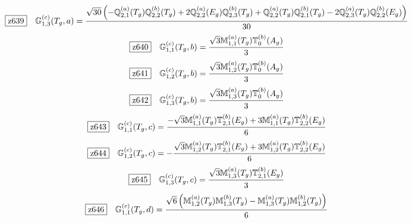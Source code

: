 \documentclass[fleqn,10pt,landscape]{jsarticle}
\begin{document}
\begin{dmath*}
\hspace*{3mm}\fbox{z639}\quad \mathbb{G}_{1,3}^{(c)}(T_{g},a)=\frac{\sqrt{30} \left(- \mathbb{Q}_{2,1}^{(a)}(T_{g}) \mathbb{Q}_{2,2}^{(b)}(T_{g}) + 2 \mathbb{Q}_{2,2}^{(a)}(E_{g}) \mathbb{Q}_{2,3}^{(b)}(T_{g}) + \mathbb{Q}_{2,2}^{(a)}(T_{g}) \mathbb{Q}_{2,1}^{(b)}(T_{g}) - 2 \mathbb{Q}_{2,3}^{(a)}(T_{g}) \mathbb{Q}_{2,2}^{(b)}(E_{g})\right)}{30}
\end{dmath*}
\begin{dmath*}
\hspace*{3mm}\fbox{z640}\quad \mathbb{G}_{1,1}^{(c)}(T_{g},b)=\frac{\sqrt{3} \mathbb{M}_{1,1}^{(a)}(T_{g}) \mathbb{T}_{0}^{(b)}(A_{g})}{3}
\end{dmath*}
\begin{dmath*}
\hspace*{3mm}\fbox{z641}\quad \mathbb{G}_{1,2}^{(c)}(T_{g},b)=\frac{\sqrt{3} \mathbb{M}_{1,2}^{(a)}(T_{g}) \mathbb{T}_{0}^{(b)}(A_{g})}{3}
\end{dmath*}
\begin{dmath*}
\hspace*{3mm}\fbox{z642}\quad \mathbb{G}_{1,3}^{(c)}(T_{g},b)=\frac{\sqrt{3} \mathbb{M}_{1,3}^{(a)}(T_{g}) \mathbb{T}_{0}^{(b)}(A_{g})}{3}
\end{dmath*}
\begin{dmath*}
\hspace*{3mm}\fbox{z643}\quad \mathbb{G}_{1,1}^{(c)}(T_{g},c)=\frac{- \sqrt{3} \mathbb{M}_{1,1}^{(a)}(T_{g}) \mathbb{T}_{2,1}^{(b)}(E_{g}) + 3 \mathbb{M}_{1,1}^{(a)}(T_{g}) \mathbb{T}_{2,2}^{(b)}(E_{g})}{6}
\end{dmath*}
\begin{dmath*}
\hspace*{3mm}\fbox{z644}\quad \mathbb{G}_{1,2}^{(c)}(T_{g},c)=- \frac{\sqrt{3} \mathbb{M}_{1,2}^{(a)}(T_{g}) \mathbb{T}_{2,1}^{(b)}(E_{g}) + 3 \mathbb{M}_{1,2}^{(a)}(T_{g}) \mathbb{T}_{2,2}^{(b)}(E_{g})}{6}
\end{dmath*}
\begin{dmath*}
\hspace*{3mm}\fbox{z645}\quad \mathbb{G}_{1,3}^{(c)}(T_{g},c)=\frac{\sqrt{3} \mathbb{M}_{1,3}^{(a)}(T_{g}) \mathbb{T}_{2,1}^{(b)}(E_{g})}{3}
\end{dmath*}
\begin{dmath*}
\hspace*{3mm}\fbox{z646}\quad \mathbb{G}_{1,1}^{(c)}(T_{g},d)=\frac{\sqrt{6} \left(\mathbb{M}_{1,2}^{(a)}(T_{g}) \mathbb{M}_{1,3}^{(b)}(T_{g}) - \mathbb{M}_{1,3}^{(a)}(T_{g}) \mathbb{M}_{1,2}^{(b)}(T_{g})\right)}{6}
\end{dmath*}
\end{document}
